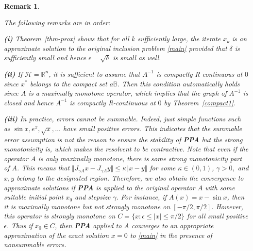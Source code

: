 \documentclass[12pt]{article}
\theoremstyle{plain}
\newtheorem{remark}{Remark}
\begin{document}
\begin{remark} \label{rm1}
{\rm The following remarks are in order:

{\bf(i)} Theorem~\ref{thm-prox} shows that for all $k$ sufficiently large, the iterate $x_k$ is an {\it approximate solution} to the original inclusion  problem \eqref{main} provided that $\delta$ is sufficiently small and hence $\epsilon=\sqrt{\delta}$ is small as well.

{\bf(ii)} If $\mathcal{H}=\mathbb{R}^n$, it is sufficient to assume that $A^{-1}$ is {\it compactly R-continuous} at $0$ since $x^*$ belongs to the compact set $a\mathbb{B}$. Then this condition  automatically holds since $A$ is a maximally monotone operator, which implies that the graph of $A^{-1}$  is closed  and hence $A^{-1}$ is compactly R-continuous at $0$ by Theorem~\ref{compact1}. 

{\bf(iii)}  In practice, {\it errors cannot be summable}. Indeed, just simple functions such as $\sin x, e^x, \sqrt{x},\ldots$ have small positive errors. This indicates that the summable error assumption is not the reason to ensure the stability of {\bf PPA} but the {\it strong monotonicity} is, which makes the resolvent to be {\it contractive}. Note that even if the operator $A$ is only maximally monotone, there is some strong monotonicity part of $A$. {This} means that $\Vert J_{\gamma A}x-J_{\gamma A}y\Vert \le \kappa \Vert x-y\Vert$ for some $\kappa\in (0,1)$, $\gamma>0,$ and  $ x, y$ belong to the designated region.  Therefore, we also obtain the convergence to approximate solutions if {\bf PPA} is applied to the original operator $A$ with some suitable initial point $x_0$ and stepsize $\gamma$. For instance, if $A(x)=x-\sin x$, then it is maximally monotone but not strongly monotone on $[-\pi/2,\pi/2]$. However, this operator is strongly monotone on $C=\{x: \epsilon\le\vert x \vert\le  \pi/2\}$ for all small positive $\epsilon$. Thus if $x_0\in C$, then {\bf PPA} applied to $A$ converges to an appropriate approximation of the exact solution $x=0$ to \eqref{main} in the presence of nonsummable errors.

}
\end{remark}
\end{document}
